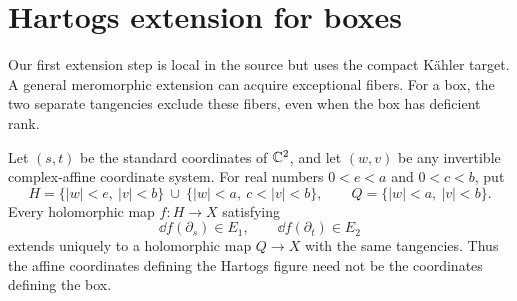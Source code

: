 \section{Hartogs extension for boxes}\label{sec:hartogs}

Our first extension step is local in the source but uses the compact
K\"ahler target.  A general meromorphic extension can acquire exceptional
fibers.  For a box, the two separate tangencies exclude these fibers, even
when the box has deficient rank.

\begin{proposition}\label{prop:hartogs}
Let $(s,t)$ be the standard coordinates of $\mathbb C^2$, and let $(w,v)$ be any
invertible complex-affine coordinate system.  For real numbers
$0<e<a$ and $0<c<b$, put
\[
 H=\bigl\{|w|<e,\ |v|<b\bigr\}
   \ \cup\ \bigl\{|w|<a,\ c<|v|<b\bigr\},
 \qquad
 Q=\bigl\{|w|<a,\ |v|<b\bigr\}.
\]
Every holomorphic map $f:H\to X$ satisfying
\[
 \dd f(\partial_s)\in E_1,
 \qquad
 \dd f(\partial_t)\in E_2
\]
extends uniquely to a holomorphic map $Q\to X$ with the same tangencies.
Thus the affine coordinates defining the Hartogs figure need not be the
coordinates defining the box.
\end{proposition}

